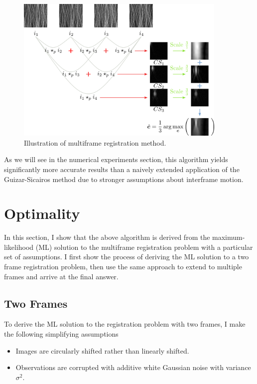 \documentclass[tocnosub,noragright,centerchapter,12pt]{uiucecethesis09}
\begin{document}
\begin{figure}[h]
  \centering
  \includegraphics[width=0.9\textwidth]{figures/multiframe.png}
  \caption{Illustration of multiframe registration method.}
  \label{fig:method}
\end{figure}

As we will see in the numerical experiments section, this algorithm yields significantly more accurate results than a naively extended application of the Guizar-Sicairos method due to stronger assumptions about interframe motion.

\section{Optimality} \label{sec:optimality}

In this section, I show that the above algorithm is derived from the maximum-likelihood (ML) solution to the multiframe registration problem with a particular set of assumptions.  I first show the process of deriving the ML solution to a two frame registration problem, then use the same approach to extend to multiple frames and arrive at the final answer.

\subsection{Two Frames}

To derive the ML solution to the registration problem with two frames, I make the following simplifying assumptions

\begin{itemize}
  \item Images are circularly shifted rather than linearly shifted.
  \item Observations are corrupted with additive white Gaussian noise with variance $\sigma^2$.
\end{itemize}
\end{document}

